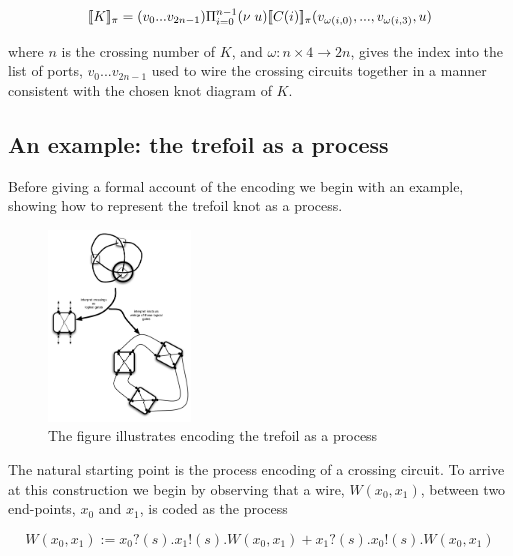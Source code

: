 \documentclass[]{llncs}
\begin{document}
\begin{equation}
  [\![ K ]\!]_{\pi} = (v_0 ... v_{2n-1}) \Pi_{i = 0}^{n-1} (\nu \; u)[\![ C(i) ]\!]_{\pi}(v_{\omega(i,0)},...,v_{\omega(i,3)},u)
\end{equation}

where $n$ is the crossing number of $K$, and $\omega: n \times 4 \to
2n$, gives the index into the list of ports, $v_0 ... v_{2n-1}$ used
to wire the crossing circuits together in a manner consistent with the
chosen knot diagram of $K$.

\subsection{An example: the trefoil as a process}
Before giving a formal account of the encoding we begin with an
example, showing how to represent the trefoil knot as a process.




\begin{figure}
\centering
\includegraphics[height=2in]{TrefoilMethodIllustration.pdf}
\caption{The figure illustrates encoding the trefoil as a
process}
\label{trefoil}
\end{figure}
The natural starting point is the process encoding of a crossing
circuit. To arrive at this construction we begin by observing that a
wire, $W(x_0,x_1)$, between two end-points, $x_0$ and $x_1$, is coded
as the process

\begin{equation}
  W(x_0,x_1) := x_0?(s).x_1!(s).W(x_0,x_1) + x_1?(s).x_0!(s).W(x_0,x_1)
\end{equation}
\end{document}
